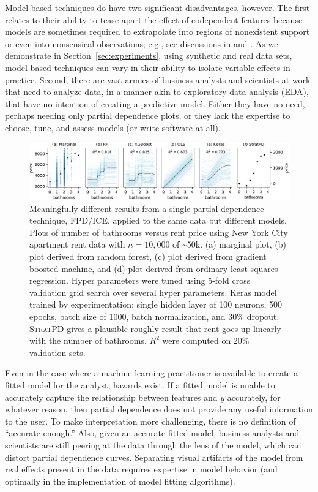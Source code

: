 \documentclass[]{article} %
\newcommand{\secref}[1]{Section~\ref{#1}}
\newcommand{\spd}{\fontfamily{cmr}\textsc{\small StratPD}}
\begin{document}
Model-based techniques do have two significant disadvantages, however. 
The first relates to their ability to tease apart the effect of codependent features because models are sometimes required to extrapolate into regions of nonexistent support or even into nonsensical observations; e.g., see discussions in \citet{ALE} and \citet{fanova}.  As we demonstrate in \secref{sec:experiments}, using synthetic and real data sets, model-based techniques can vary in their ability to isolate variable effects in practice.  Second, there are vast armies of business analysts and scientists at work that need to analyze data, in a manner akin to exploratory data analysis (EDA), that have no intention of creating a predictive model.  Either they have no need, perhaps needing only partial dependence plots, or they lack the expertise to choose, tune, and assess models (or write software at all).

\begin{figure}
\begin{center}
\includegraphics[scale=0.65]{images/bathrooms_vs_price.pdf}\vspace{-3mm}
\caption{\small Meaningfully different results from a single partial dependence technique, FPD/ICE, applied to the same data but different models. Plots of number of bathrooms versus rent price using New York City apartment rent data \citep{rent} with $n=10,000$ of \textasciitilde50k. (a) marginal plot, (b) plot derived from random forest, (c)  plot derived from gradient boosted machine, and (d) plot derived from ordinary least squares regression. Hyper parameters were tuned using 5-fold cross validation grid search over several hyper parameters. Keras model trained by experimentation: single hidden layer of 100 neurons, 500 epochs, batch size of 1000, batch normalization, and 30\% dropout. \spd{} gives a plausible roughly result that rent goes up linearly with the number of bathrooms. $R^2$ were computed on 20\% validation sets.\vspace{-7mm}}
\label{fig:baths_price}
\end{center}
\end{figure}

Even in the case where a machine learning practitioner is available to create a fitted model for the analyst, hazards exist. If a fitted model is unable to accurately capture the relationship between features and $y$ accurately, for whatever reason, then partial dependence does not provide any useful information to the user.  To make interpretation more challenging, there is no definition of ``accurate enough.'' Also, given an accurate fitted model, business analysts and scientists are still peering at the data through the lens of the model, which can distort partial dependence curves. Separating visual artifacts of the model from real effects present in the data requires expertise in model behavior (and optimally in the implementation of model fitting algorithms). 
\end{document}
